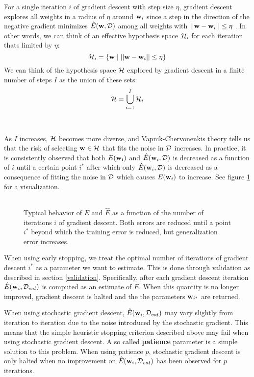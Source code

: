 For a single iteration $i$ of gradient descent with step size $\eta$, gradient descent explores all weights in a radius of $\eta$ around $\mathbf{w}_i$ since a step in the direction of the negative gradient minimizes $\hat{E}(\mathbf{w}, \mathcal{D})$ among all weights with $||\mathbf{w} - \mathbf{w}_i|| \leq \eta$ \citep{yaser12}. In other words, we can think of an effective hypothesis space $\mathcal{H}_i$ for each iteration thats limited by $\eta$:
$$
\mathcal{H}_i = \{\mathbf{w} \mid ||\mathbf{w} - \mathbf{w}_i|| \leq \eta\}
$$
We can think of the hypothesis space $\mathcal{H}$ explored by gradient descent in a finite number of steps $I$ as the union of these sets:
$$
\mathcal{H} = \bigcup\limits_{i = 1}^I \mathcal{H}_i
$$
\\\\
As $I$ increases, $\mathcal{H}$ becomes more diverse, and Vapnik-Chervonenkis theory tells us that the risk of selecting $\mathbf{w} \in \mathcal{H}$ that fits the noise in $\mathcal{D}$ increases. In practice, it is consistently observed that both $E(\mathbf{w_i})$ and $\hat{E}(\mathbf{w}_i, \mathcal{D})$ is decreased as a function of $i$ until a certain point $i^*$ after which only $\hat{E}(\mathbf{w}_i, \mathcal{D})$ is decreased as a consequence of fitting the noise in $\mathcal{D}$ which causes $E(\mathbf{w}_i)$ to increase. See figure \ref{early_stopping} for a visualization.
\\\\
\begin{figure}
	
	\caption{Typical behavior of $E$ and $\hat{E}$ as a function of the number of iterations $i$ of gradient descent. Both errors are reduced until a point $i^*$ beyond which the training error is reduced, but generalization error increases.}
	\label{early_stopping}
\end{figure}
When using early stopping, we treat the optimal number of iterations of gradient descent $i^*$ as a parameter we want to estimate. This is done through validation as described in section \ref{validation}. Specifically, after each gradient descent iteration $\hat{E}(\mathbf{w}_i, \mathcal{D}_{val})$ is computed as an estimate of $E$. When this quantity is no longer improved, gradient descent is halted and the the parameters $\mathbf{w}_{i^*}$ are returned.

When using stochastic gradient descent, $\hat{E}(\mathbf{w}_i, \mathcal{D}_{val})$ may vary slightly from iteration to iteration due to the noise introduced by the stochastic gradient. This means that the simple heuristic stopping criterion described above may fail when using stochastic gradient descent. A so called \textbf{patience} parameter is a simple solution to this problem. When using patience $p$, stochastic gradient descent is only halted when no improvement on $\hat{E}(\mathbf{w}_i, \mathcal{D}_{val})$ has been observed for $p$ iterations.